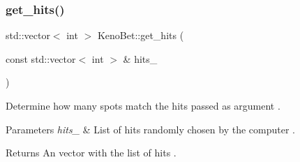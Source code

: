 \subsubsection{\texorpdfstring{get\+\_\+hits()}{get\_hits()}}
{\footnotesize\ttfamily std\+::vector$<$ int $>$ Keno\+Bet\+::get\+\_\+hits (\begin{DoxyParamCaption}\item[{const std\+::vector$<$ int $>$ \&}]{hits\+\_\+ }\end{DoxyParamCaption})}



Determine how many spots match the hits passed as argument . 


\begin{DoxyParams}{Parameters}
{\em hits\+\_\+} & List of hits randomly chosen by the computer . \\
\hline
\end{DoxyParams}
\begin{DoxyReturn}{Returns}
An vector with the list of hits . 
\end{DoxyReturn}

